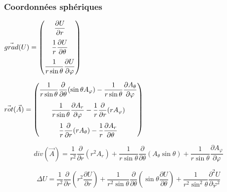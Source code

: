 \documentclass[
10pt,
aspectratio=169,
]{beamer}
\begin{document}
\begin{frame} 
\frametitle{Coordonnées sphériques}

\center\begin{minipage}[t]{0.35\textwidth}
$\vec{grad}(U)=\begin{pmatrix}
\dfrac{\partial U}{\partial r} \vspace{0.25cm}\\
\dfrac{1}{r}\dfrac{\partial U}{\partial \theta} \vspace{0.25cm}\\
\dfrac{1}{r \sin\theta}\dfrac{\partial U}{\partial \varphi}
\end{pmatrix}$
\end{minipage}
\hfill
\begin{minipage}[t]{0.55\textwidth}

$\vec{rot}(\vec{A})=\begin{pmatrix}
\dfrac{1}{r \sin\theta}\dfrac{\partial}{\partial \theta}(\sin\theta A_\varphi)-\dfrac{1}{r \sin\theta}\dfrac{\partial A_\theta}{\partial\varphi} \vspace{0.25cm}\\
\dfrac{1}{r \sin\theta}\dfrac{\partial A_r}{\partial \varphi}-\dfrac{1}{r}\dfrac{\partial}{\partial r} (r A_\varphi)\vspace{0.25cm}\\
\dfrac{1}{r}\dfrac{\partial}{\partial r}(r A_\theta)-\dfrac{1}{r}\dfrac{\partial A_r}{\partial \theta}
\end{pmatrix}$

\end{minipage}

\vspace{0.5cm}
\[div(\vec{A})=\dfrac{1}{r^2}\dfrac{\partial}{\partial r}(r^2 A_r)+\dfrac{1}{r \sin\theta}\dfrac{\partial}{\partial \theta}(A_\theta \sin\theta)+\dfrac{1}{r\sin\theta}\dfrac{\partial A_\varphi}{\partial \varphi}\]

\vspace{0.5cm}
\[\Delta U=\dfrac{1}{r^2}\dfrac{\partial}{\partial r}(r^2 \dfrac{\partial U}{\partial r})+\dfrac{1}{r^2 \sin\theta}\dfrac{\partial}{\partial \theta}(\sin\theta\dfrac{\partial U}{\partial \theta})+\dfrac{1}{r^2 \sin^2\theta}\dfrac{\partial^2 U}{\partial \varphi^2}\]

\end{frame}

\end{document}
